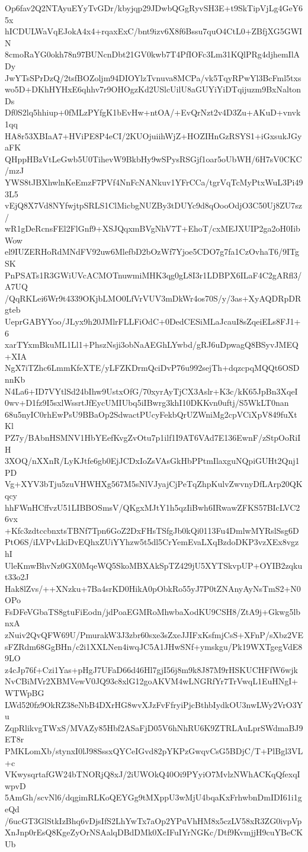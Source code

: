 Op6fav2Q2NTAyuEYyTvGDr/kbyjqp29JDwbQGgRyvSH3E+t9SkTipVjLg4GeY65x
hICDULWaVqEJokA4x4+rqaxExC/bnt9izv6X8f6Bssu7quO4CtL0+ZBfjXG5GWIN
8cmoRaYG0okh78n97BUNcnDbt21GV0kwb7T4PfIOFc3Lm31KQlPRg4djhemIlADy
JwYTsSPrDzQ/2tsfBOZoljm94DIOYlzTvnuva8MCPa/vk5TqyRPwYl3BcFml5txs
wo5D+DKhHYHxE6qhhv7r9OHOgzKd2USlcUilU8aGUYiYiDTqijuzm9BxNaltonDs
Df0S2lq5hhiup+0fMLzPYfgK1bEvHw+ntOA/+EvQrNzt2v4D3Zu+AKuD+vnvk1qq
HA8r53XBIaA7+HViPE8P4eCI/2KUOjuiihWjZ+HOZIHnGzRSYS1+iGxsukJGyaFK
QHppHBzVtLeGwb5U0TihevW9BkbHy9wSPysRSGjf1oar5oUbWH/6H7sV0CKC/mzJ
YWS8tJBXhwlnKeEmzF7PVf4NnFcNANkuv1YFrCCa/tgrVqTcMyPtxWuL3Pi493L5
vEjQ8X7Vd8NYfwjtpSRLS1ClMicbgNUZBy3tDUYc9d8qOooOdjO3C50Uj8ZU7sz/
wR1gDeRcnsFEl2FlGnf9+XSJQqxmBVgNhV7T+EhoT/cxMEJXUIP2ga2oH0IibWow
el9IUZERHoRdMNdFV92uw6MlefbD2bOzWf7Yjoe5CDO7g7fa1CzOvhaT6/9ITgSK
PnPSATs1R3GWiUVcACMOTnuwmiMHK3qg0gL8I3r1LDBPX6ILaF4C2gARfl3/A7UQ
/QqRKLei6Wr9t4339OKjbLMO0LfVrVUV3mDkWr4os70S/y/3as+XyAQDRpDRgteb
UeprGABYYoo/JLyx9h20JMlrFLLFiOdC+0DedCESiMLaJcauI8sZqeiELs8FJ1+6
xarTYxmBkuML1Ll1+PhszNsji3obNaAEGhLYwbd/gRJ6uDpwagQ8BSyvJMEQ+XIA
NgX7iTZhc6LmmKfeXTE/yLFZKDrmQciDvP76u992sejTh+dqzcpqMQQt6OSDnnKb
N4La6+ID7VYtlSd24bIhw9UstxOfG/70xyrAyTjCX3Aslr+K3c/kK65JpBn3XqeI
0wv+D1fz9I5sxlWssrtJfEycUMIUbq5iIBwrg3khI10DKKvn0uftj/S5WkLT0nan
68u5nyIC0rhEwPsU9BBaOp2SdwactPUcyFekbQrUZWniMg2cpVCiXpV849fuXtKl
PZ7y/BAbnHSMNV1HbYEefKvgZvOtu7p1ilf1I9AT6VAd7E136EwnF/zStpOoRiIH
3XOQ/nXXnR/LyKJtfe6gb0EjJCDxIoZsVAsGkHbPPtmIlaxguNQpiGUHt2Qnj1PD
Vg+XYV3bTju5zuVHWHXg567M5sNlVJyajCjPeTqZhpKulvZwvnyDfLArp20QKqcy
hhFWnHCffvzU51LIBBOSmsV/QKgxMJtY1h5qzIiBwh6IRwawZFKS57BIcLVC26vx
+Kfc3zdtccbnxtsTBNf7Tpn6GoZ2DxFHsTSfgJb0kQi0113Fu4DmlwMYRslSsg6D
PtO6S/iLVPvLkiDvEQhxZUiYYhzw5t5dl5CrYemEvaLXqBzdoDKP3vzXEx8vgzhI
UleKmwBhvNz0GX0MqeWQ5SkoMBXAkSpTZ429jU5XYTSkvpUP+OYIB2zqkut33o2J
Hak8lZvs/++XNzku+7Ba4srKD0HikA0pObkRo55yJ7P0tZNAnyAyNsTmS2+N0OPo
FsDFeVGbaTS8gtuFiEodn/jdPoaEGMRoMhwbaXodKU9CSH8/ZtA9j+Gkwg5lbnxA
zNuiv2QvQFW69U/PmurakW3J3zbr60sxe3sZxeJJIFxKsfmjCsS+XFnP/sXbz2VE
sFZRdm68GgBHn/c2i1XXLNen4iwqJC5A1JHwSNf+ymskgu/Pk19WXTgegVdE89LO
z4cJp76f+Czi1Yas+pHgJ7UFaD66d46Hl7gjI56j8m9k8J87M9rHSKUCHFfW6wjk
NvCBiMVr2XBMVewV0JQ93c8xlG12goAKVM4wLNGRfYr7TrVwqL1EuHNgI+WTWpBG
LWd520fz9OkRZ38eNbB4DXrHG8wvXJzFvFfryiPjcBthbIydkOU3nwLWy2VrO3Yu
ZqpRlikvgTWxS/MVAZy85Hbf2ASaFjD05V6hNhRU6K9ZTRLAuLprSWdmaBJ9ET8r
PMKLomXb/stynxI0lJ98SssxQYCeIGvd82pYKPzGwqvCsG5BDjC/T+PlBgl3VL+c
VKwysqrtafGW24bTNORjQ8xJ/2iUWOkQ40Oi9PYyiO7MvlzNWhACKqQfexqIwpvD
5AmGh/scvNl6/dqgimRLKoQEYGg9tMXppU3wMjU4bqaKxFrhwbnDmIDI61i1geQd
/6ucGT3GlStkIzBhq6vDjsIfS2LhYwTx7aOp2YPuVhHM8x5czLV58xR3ZG0ivpVp
XnJnp0rEsQ8KgeZyOrNSAalqDBdDMk0XcIFuIYrNGKc/Dtf9KvmjjH9cuYBeCKUb
